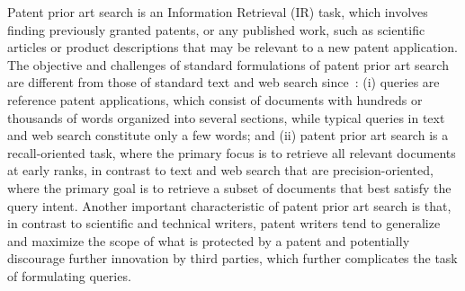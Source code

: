 \begin{comment}
Patents are used by legal entities to legally protect their
inventions and represent a multi-billion dollar industry of licensing
and litigation. In 2013, 302,948 patent applications were approved
in the US alone%
\footnote{http://www.uspto.gov/web/offices/ac/ido/oeip/taf/ us\_stat.htm%
}, a number that has doubled in the past 15 years. Given that a single
existing patent may invalidate a new patent application, helping inventors
assess the patentability of an idea through a patent prior art search
before writing a complete patent application is an important task.
\end{comment}

Patent prior art search is an Information Retrieval (IR) task, which involves 
finding previously granted patents, or any published work, such 
as scientific articles or product descriptions 
that may be relevant to a new patent application. The objective and
challenges of standard formulations of patent prior art search are
different from those of standard text and web search
since~\cite{magdy2012toward}: (i) queries are reference patent
applications, which consist of documents with hundreds or thousands of
words organized into several sections, while typical queries in text
and web search constitute only a few words; and (ii) patent prior art
search is a recall-oriented task, where the primary focus is to
retrieve all relevant documents at early ranks, in contrast to text
and web search that are precision-oriented, where the primary goal is
to retrieve a subset of documents that best satisfy the query
intent. Another important characteristic of patent prior art search is
that, in contrast to scientific and technical writers, patent writers
tend to generalize and maximize the scope of what is protected by a
patent and potentially discourage further innovation by third parties,
which further complicates the task of formulating queries.

